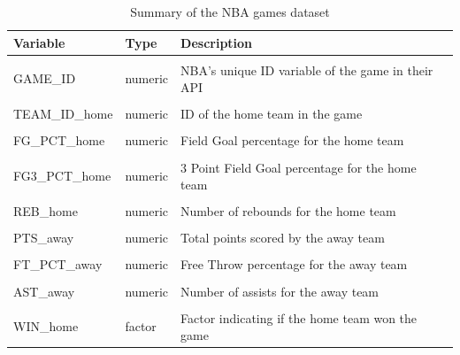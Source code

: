 \documentclass[
  12pt,
  a4paper,
]{article}
\begin{document}
\begin{table}[H]
\caption{\label{tab:gamesdesc}Summary of the NBA games dataset}
\centering
\begin{tabular}[t]{lll}
\toprule
Variable & Type & Description\\
\midrule
\cellcolor{gray!30}{GAME\_DATE\_EST} & \cellcolor{gray!30}{Date} & \cellcolor{gray!30}{Date in which the game took place (Year-Month-Day)}\\
GAME\_ID & numeric & NBA's unique ID variable of the game in their API\\
\cellcolor{gray!30}{SEASON} & \cellcolor{gray!30}{numeric} & \cellcolor{gray!30}{Season indicator}\\
TEAM\_ID\_home & numeric & ID of the home team in the game\\
\cellcolor{gray!30}{PTS\_home} & \cellcolor{gray!30}{numeric} & \cellcolor{gray!30}{Total points scored by the home team}\\
FG\_PCT\_home & numeric & Field Goal percentage for the home team\\
\cellcolor{gray!30}{FT\_PCT\_home} & \cellcolor{gray!30}{numeric} & \cellcolor{gray!30}{Free Throw percentage for the home team}\\
FG3\_PCT\_home & numeric & 3 Point Field Goal percentage for the home team\\
\cellcolor{gray!30}{AST\_home} & \cellcolor{gray!30}{numeric} & \cellcolor{gray!30}{Number of assists for the home team}\\
REB\_home & numeric & Number of rebounds for the home team\\
\cellcolor{gray!30}{TEAM\_ID\_away} & \cellcolor{gray!30}{numeric} & \cellcolor{gray!30}{ID of the away team in the game}\\
PTS\_away & numeric & Total points scored by the away team\\
\cellcolor{gray!30}{FG\_PCT\_away} & \cellcolor{gray!30}{numeric} & \cellcolor{gray!30}{Field Goal percentage for the away team}\\
FT\_PCT\_away & numeric & Free Throw percentage for the away team\\
\cellcolor{gray!30}{FG3\_PCT\_away} & \cellcolor{gray!30}{numeric} & \cellcolor{gray!30}{3 Point Field Goal percentage for the away team}\\
AST\_away & numeric & Number of assists for the away team\\
\cellcolor{gray!30}{REB\_away} & \cellcolor{gray!30}{numeric} & \cellcolor{gray!30}{Number of rebounds for the away team}\\
WIN\_home & factor & Factor indicating if the home team won the game\\
\bottomrule
\end{tabular}
\end{table}
\end{document}
